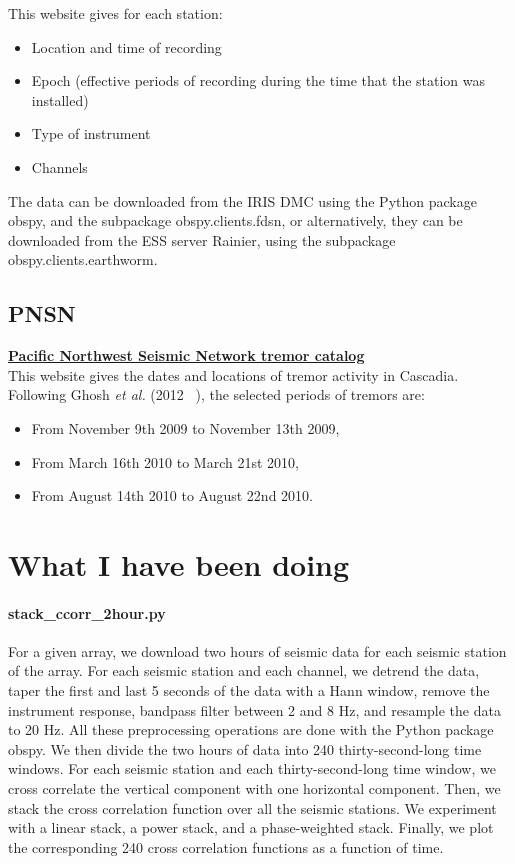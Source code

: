 \documentclass[workdone.tex]{subfiles}
\begin{document}
This website gives for each station:
\begin{itemize}
	\item Location and time of recording
	\item Epoch (effective periods of recording during the time that the station was installed)
	\item Type of instrument
	\item Channels
\end{itemize}

The data can be downloaded from the IRIS DMC using the Python package obspy, and the subpackage obspy.clients.fdsn, or alternatively, they can be downloaded from the ESS server Rainier, using the subpackage obspy.clients.earthworm.

\subsection{PNSN}

\href{https://www.pnsn.org/tremor}{\textbf{Pacific Northwest Seismic Network tremor catalog}} \\

This website gives the dates and locations of tremor activity in Cascadia. Following Ghosh \textit{et al.} (2012 ~\cite{GHO_2012}), the selected periods of tremors are:
\begin{itemize}
	\item From November 9th 2009 to November 13th 2009,
	\item From March 16th 2010 to March 21st 2010,
	\item From August 14th 2010 to August 22nd 2010.
\end{itemize}

\section{What I have been doing}

\paragraph{stack\_ccorr\_2hour.py} For a given array, we download two hours of seismic data for each seismic station of the array. For each seismic station and each channel, we detrend the data, taper the first and last 5 seconds of the data with a Hann window, remove the instrument response, bandpass filter between 2 and 8 Hz, and resample the data to 20 Hz. All these preprocessing operations are done with the Python package obspy. We then divide the two hours of data into 240 thirty-second-long time windows. For each seismic station and each thirty-second-long time window, we cross correlate the vertical component with one horizontal component. Then, we stack the cross correlation function over all the seismic stations. We experiment with a linear stack, a power stack, and a phase-weighted stack. Finally, we plot the corresponding 240 cross correlation functions as a function of time. 
\end{document}
